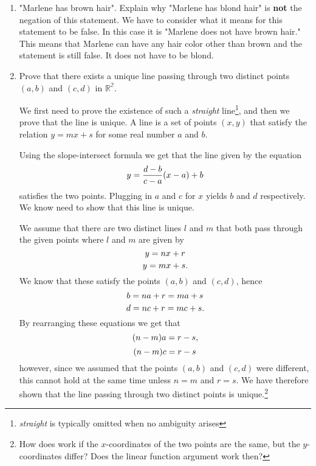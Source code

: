 \documentclass[a4paper, 11pt]{report}
\theoremstyle{plain}
\theoremstyle{definition}
\begin{document}
\begin{enumerate}
    \item "Marlene has brown hair". Explain why "Marlene has blond hair" is
      \textbf{not} the negation of this statement.
      We have to consider what it means for this statement to be false. In this
      case it is "Marlene does not have brown hair." This means that Marlene
      can have any hair color other than brown and the statement is still false.
      It does not have to be blond. 

    \item Prove that there exists a unique line passing through two distinct
      points $(a, b)$ and $(c, d)$ in $ \mathbb{R^2}$.
       
      We first need to prove the existence of such a \textit{straight}
      line\footnote{ \textit{straight} is typically omitted when no ambiguity
      arises}, and then we prove that the line is unique. A line is a set of
      points $(x, y)$ that satisfy the relation $y = mx + s$ for some real
      number $a$ and $b$.

      Using the slope-intersect formula we get that the line given by the
      equation
      \begin{equation}
        \notag
        y = \frac{d - b}{c - a}(x - a) + b
      \end{equation}
      satisfies the two points. Plugging in $a$ and $c$ for $x$ yields $b$ and
      $d$ respectively. We know need to show that this line is unique.
    
      We assume that there are two distinct lines $l$ and $m$ that both pass through the given points where $l$ and $m$ are given by
      \begin{equation}
        \notag
        y = nx + r
      \end{equation}
      \begin{equation}
        \notag
        y = mx + s.
      \end{equation}
      We know that these satisfy the points $(a, b)$ and $(c, d)$, hence
      \begin{equation}
        \notag
        b = na + r = ma + s 
      \end{equation}
      \begin{equation}
        \notag
        d = nc + r = mc + s.
      \end{equation}
      By rearranging these equations we get that
      \begin{equation}
        \notag
        (n - m)a = r - s, 
      \end{equation}
      \begin{equation}
        \notag
        (n - m)c = r - s
      \end{equation}
      however, since we assumed that the points $(a, b)$ and $(c, d)$ were
      different, this cannot hold at the same time unless $n = m$ and $r = s$.
      We have therefore shown that the line passing through two distinct points
      is unique.\footnote{How does work if the $x$-coordinates of the two
      points are the same, but the $y$-coordinates differ? Does the linear
    function argument work then?}


\end{enumerate}
\end{document}
